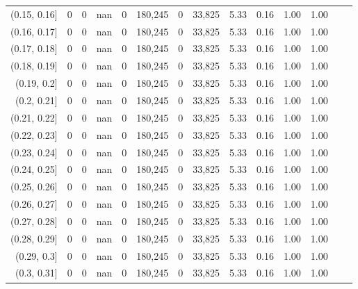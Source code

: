 \begin{tabular}{rrrrrrrrrrrrrr}
(0.15, 0.16]   &        0 &       0 &    nan &        0 &  180,245 &       0 &  33,825 &  5.33 &  0.16 &  1.00 &      1.00 \\
(0.16, 0.17]   &        0 &       0 &    nan &        0 &  180,245 &       0 &  33,825 &  5.33 &  0.16 &  1.00 &      1.00 \\
(0.17, 0.18]   &        0 &       0 &    nan &        0 &  180,245 &       0 &  33,825 &  5.33 &  0.16 &  1.00 &      1.00 \\
(0.18, 0.19]   &        0 &       0 &    nan &        0 &  180,245 &       0 &  33,825 &  5.33 &  0.16 &  1.00 &      1.00 \\
(0.19, 0.2]    &        0 &       0 &    nan &        0 &  180,245 &       0 &  33,825 &  5.33 &  0.16 &  1.00 &      1.00 \\
(0.2, 0.21]    &        0 &       0 &    nan &        0 &  180,245 &       0 &  33,825 &  5.33 &  0.16 &  1.00 &      1.00 \\
(0.21, 0.22]   &        0 &       0 &    nan &        0 &  180,245 &       0 &  33,825 &  5.33 &  0.16 &  1.00 &      1.00 \\
(0.22, 0.23]   &        0 &       0 &    nan &        0 &  180,245 &       0 &  33,825 &  5.33 &  0.16 &  1.00 &      1.00 \\
(0.23, 0.24]   &        0 &       0 &    nan &        0 &  180,245 &       0 &  33,825 &  5.33 &  0.16 &  1.00 &      1.00 \\
(0.24, 0.25]   &        0 &       0 &    nan &        0 &  180,245 &       0 &  33,825 &  5.33 &  0.16 &  1.00 &      1.00 \\
(0.25, 0.26]   &        0 &       0 &    nan &        0 &  180,245 &       0 &  33,825 &  5.33 &  0.16 &  1.00 &      1.00 \\
(0.26, 0.27]   &        0 &       0 &    nan &        0 &  180,245 &       0 &  33,825 &  5.33 &  0.16 &  1.00 &      1.00 \\
(0.27, 0.28]   &        0 &       0 &    nan &        0 &  180,245 &       0 &  33,825 &  5.33 &  0.16 &  1.00 &      1.00 \\
(0.28, 0.29]   &        0 &       0 &    nan &        0 &  180,245 &       0 &  33,825 &  5.33 &  0.16 &  1.00 &      1.00 \\
(0.29, 0.3]    &        0 &       0 &    nan &        0 &  180,245 &       0 &  33,825 &  5.33 &  0.16 &  1.00 &      1.00 \\
(0.3, 0.31]    &        0 &       0 &    nan &        0 &  180,245 &       0 &  33,825 &  5.33 &  0.16 &  1.00 &      1.00 \\

\end{tabular}
